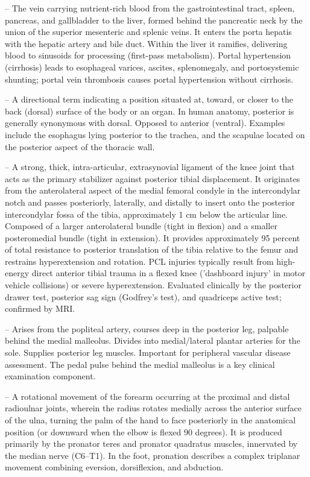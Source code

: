 -- The vein carrying nutrient-rich blood from the gastrointestinal tract, spleen, pancreas, and gallbladder to the liver, formed behind the pancreatic neck by the union of the superior mesenteric and splenic veins. It enters the porta hepatis with the hepatic artery and bile duct. Within the liver it ramifies, delivering blood to sinusoids for processing (first-pass metabolism). Portal hypertension (cirrhosis) leads to esophageal varices, ascites, splenomegaly, and portosystemic shunting; portal vein thrombosis causes portal hypertension without cirrhosis.

-- A directional term indicating a position situated at, toward, or closer to the back (dorsal) surface of the body or an organ. In human anatomy, posterior is generally synonymous with dorsal. Opposed to anterior (ventral). Examples include the esophagus lying posterior to the trachea, and the scapulae located on the posterior aspect of the thoracic wall.

-- A strong, thick, intra-articular, extrasynovial ligament of the knee joint that acts as the primary stabilizer against posterior tibial displacement. It originates from the anterolateral aspect of the medial femoral condyle in the intercondylar notch and passes posteriorly, laterally, and distally to insert onto the posterior intercondylar fossa of the tibia, approximately 1 cm below the articular line. Composed of a larger anterolateral bundle (tight in flexion) and a smaller posteromedial bundle (tight in extension). It provides approximately 95 percent of total resistance to posterior translation of the tibia relative to the femur and restrains hyperextension and rotation. PCL injuries typically result from high-energy direct anterior tibial trauma in a flexed knee ('dashboard injury' in motor vehicle collisions) or severe hyperextension. Evaluated clinically by the posterior drawer test, posterior sag sign (Godfrey's test), and quadriceps active test; confirmed by MRI.

-- Arises from the popliteal artery, courses deep in the posterior leg, palpable behind the medial malleolus. Divides into medial/lateral plantar arteries for the sole. Supplies posterior leg muscles. Important for peripheral vascular disease assessment. The pedal pulse behind the medial malleolus is a key clinical examination component.

-- A rotational movement of the forearm occurring at the proximal and distal radioulnar joints, wherein the radius rotates medially across the anterior surface of the ulna, turning the palm of the hand to face posteriorly in the anatomical position (or downward when the elbow is flexed 90 degrees). It is produced primarily by the pronator teres and pronator quadratus muscles, innervated by the median nerve (C6--T1). In the foot, pronation describes a complex triplanar movement combining eversion, dorsiflexion, and abduction.

